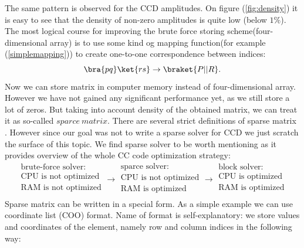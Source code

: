 \documentclass[twoside,english]{uiofysmaster}
\begin{document}
The same pattern is observed for the CCD amplitudes. On figure (\ref{fig:density}) it is easy to see that the density of non-zero amplitudes is quite low (below $1\%$). The most logical course for improving the brute force storing scheme(four-dimensional array) is to use some kind og mapping function(for example (\ref{simplemapping})) to create one-to-one correspondence between indices:
\begin{equation}
\bra{pq}\ket{rs} \rightarrow \braket{P||R}.
\end{equation} 
Now we can store matrix in computer memory instead of four-dimensional array. However we have not gained any significant performance yet, as we still store a lot of zeros. But taking into account density of the obtained matrix, we can treat it as so-called $sparce\ matrix$. There are several strict definitions of sparse matrix \cite{PissanetzkySparseMatrixTechnology2014}. However since our goal was not to write a sparse solver for CCD we just scratch the surface of this topic. We find sparse solver to be worth mentioning as it provides overview of the whole CC code optimization strategy:
\[
\begin{matrix} 
\text{brute-force solver:}\\
\text{CPU is not optimized}\\
\text{RAM is not optimized}\\
 \end{matrix} \rightarrow
 \begin{matrix} 
 \text{sparce solver:}\\
 \text{CPU is not optimized}\\
 \text{RAM is optimized}\\
\end{matrix} \rightarrow
 \begin{matrix} 
 \text{block solver:}\\
 \text{CPU is optimized}\\
 \text{RAM is optimized}\\
 \end{matrix}
\]
Sparse matrix can be written in a special form. As a simple example we can use coordinate list (COO) format. Name of format is self-explanatory: we store values and coordinates of the element, namely row and column indices in the following way:
\end{document}
